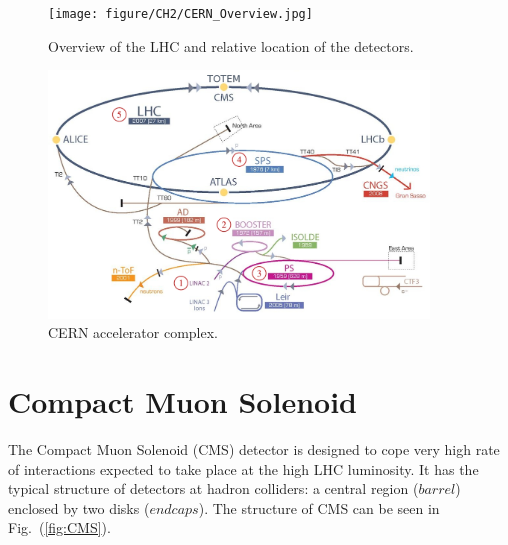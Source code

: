 \begin{figure}[hbtp]
  \begin{center}
    \texttt{[image: figure/CH2/CERN\_Overview.jpg]}
  \end{center}
  \caption{\label{fig:LHC_overview}Overview of the LHC and relative location of the detectors.}
\end{figure}

\begin{figure}[hbtp]
  \begin{center}
    \includegraphics[width=0.9\textwidth]{figure/CH2/complex.png}
  \end{center}
  \caption{\label{fig:accelerator}CERN accelerator complex.}
\end{figure}

\section{Compact Muon Solenoid}
The Compact Muon Solenoid (CMS) detector is designed to cope very high rate of interactions expected to take place at the high LHC luminosity. It has the typical structure of detectors at hadron colliders: a central region ($barrel$) enclosed by two disks ($endcaps$). The structure of CMS can be seen in Fig.~(\ref{fig:CMS}).\\
